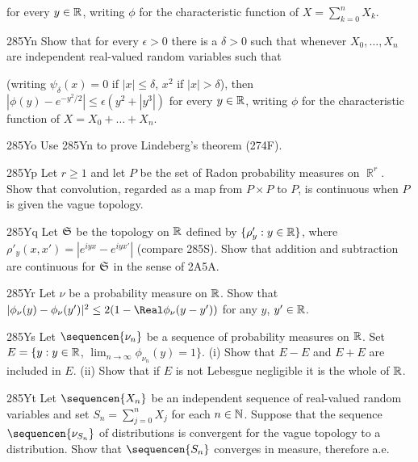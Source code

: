 {\noindent for every $y\in\Bbb R$, writing $\phi$ for the characteristic
function of $X=\sum_{k=0}^nX_k$.

\spheader 285Yn Show that for every $\epsilon>0$ there is a
$\delta>0$ such that whenever $X_0,\ldots,X_n$ are independent
real-valued random variables such that


\noindent (writing $\psi_{\delta}(x)=0$ if $|x|\le\delta$, $x^2$ if
$|x|>\delta$), then $|\phi(y)-e^{-y^2/2}|\le\epsilon(y^2+|y^3|)$
for every $y\in\Bbb R$, writing $\phi$ for the characteristic
function of $X=X_0+\ldots+X_n$.

\spheader 285Yo Use 285Yn to prove Lindeberg's theorem (274F).

\spheader 285Yp Let $r\ge 1$ and let $P$ be the set of Radon
probability measures on $\BbbR^r$.   Show that convolution, regarded as
a map from $P\times P$ to $P$, is continuous when $P$ is given the vague
topology.

\spheader 285Yq Let $\frak S$ be the topology on $\Bbb R$
defined by $\{\rho'_y:y\in\Bbb R\}$, where
$\rho'_y(x,x')=|e^{iyx}-e^{iyx'}|$ (compare 285S).   Show that addition
and subtraction are continuous for $\frak S$ in the sense of 2A5A.

\spheader 285Yr Let $\nu$ be a probability measure on
$\Bbb R$.   Show that
$|\phi_{\nu}(y)-\phi_{\nu}(y')|^2\le 2(1-\Real\phi_{\nu}(y-y'))$ for any
$y$, $y'\in\Bbb R$.

\spheader 285Ys Let $\sequencen{\nu_n}$ be a sequence of
probability measures on $\Bbb R$.   Set $E=\{y:y\in\Bbb R$,
$\lim_{n\to\infty}\phi_{\nu_n}(y)=1\}$.   (i) Show that $E-E$ and
$E+E$ are included in $E$.   (ii) Show that if $E$ is not Lebesgue
negligible it is the whole of $\Bbb R$.

\spheader 285Yt
Let $\sequencen{X_n}$ be an independent sequence of
real-valued random variables and set $S_n=\sum_{j=0}^nX_j$ for each
$n\in\Bbb N$.
Suppose that the sequence $\sequencen{\nu_{S_n}}$ of distributions is
convergent for the vague topology to a distribution.
Show that $\sequencen{S_n}$ converges in measure, therefore a.e.
}%

